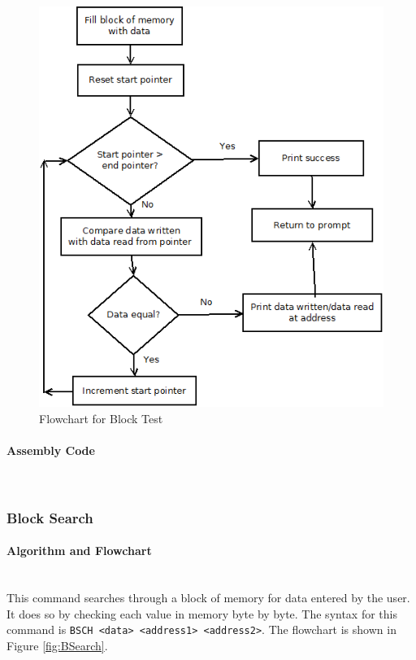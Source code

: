 \documentclass[12pt]{article}
\begin{document}
\begin{figure}[H]
\centering
\includegraphics[width=0.7\linewidth]{BTST}
\caption{Flowchart for Block Test}
\label{fig:BTST}
\end{figure}
			
			\paragraph{Assembly Code}~\\				%
			
			\subsubsection{Block Search}
			
			\paragraph{Algorithm and Flowchart}~\\
			This command searches through a block of memory for data entered by the user. It does so by checking each value in memory byte by byte. The syntax for this command is \texttt{BSCH <data> <address1> <address2>}. The flowchart is shown in Figure \ref{fig:BSearch}.
			
			
			
\end{document}
